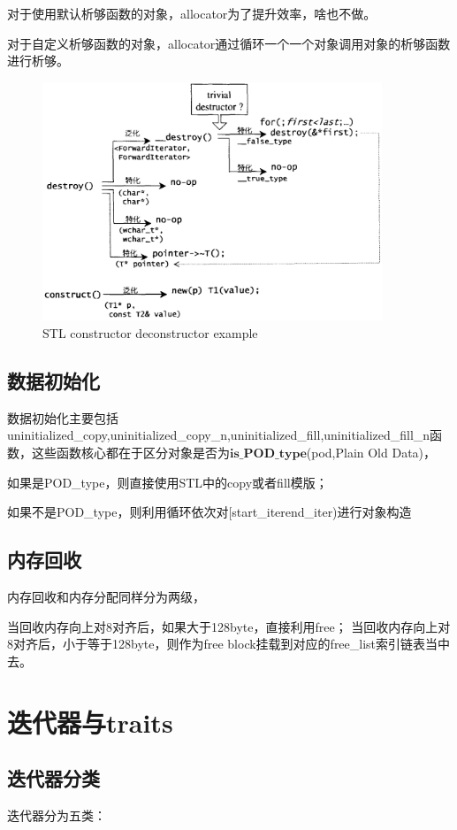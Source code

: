 \documentclass[a4paper,fontset=mac]{ctexart}
\begin{document}
		对于使用默认析够函数的对象，allocator为了提升效率，啥也不做。
		
		对于自定义析够函数的对象，allocator通过循环一个一个对象调用对象的析够函数进行析够。
		\begin{figure}
			\centering
			\includegraphics[width=4in]{STL_de_constructor}
			\caption{STL constructor deconstructor example}
			\label{STL_Constructor} %
		\end{figure}
		
		\subsection{数据初始化}
		数据初始化主要包括uninitialized\_copy,uninitialized\_copy\_n,uninitialized\_fill,uninitialized\_fill\_n函数，这些函数核心都在于区分对象是否为$\boldsymbol{is\_POD\_type}$(pod,Plain Old Data)，
		
		如果是POD\_type，则直接使用STL中的copy或者fill模版；
		
		如果不是POD\_type，则利用循环依次对[start\_iterend\_iter)进行对象构造
		
		\subsection{内存回收}
		内存回收和内存分配同样分为两级，
		
		当回收内存向上对8对齐后，如果大于128byte，直接利用free；
		当回收内存向上对8对齐后，小于等于128byte，则作为free block挂载到对应的free\_list索引链表当中去。
		
	
		\section{迭代器与traits}
		\subsection{迭代器分类}
		迭代器分为五类：
		
\end{document}
